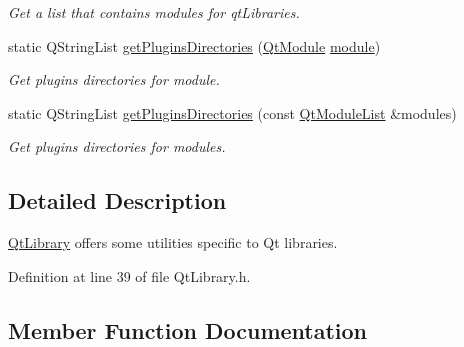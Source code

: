 \begin{DoxyCompactItemize}
\begin{DoxyCompactList}\small\item\em Get a list that contains modules for {\itshape qt\+Libraries}. \end{DoxyCompactList}\item 
static Q\+String\+List \hyperlink{class_mdt_1_1_deploy_utils_1_1_qt_library_a50c96c2d0b892da7c41d50ca627191bd}{get\+Plugins\+Directories} (\hyperlink{namespace_mdt_1_1_deploy_utils_af64a196dd2a56ed4930253e7fb4ed591}{Qt\+Module} \hyperlink{class_mdt_1_1_deploy_utils_1_1_qt_library_aa54f542e548bcab6da5e8a9696169a94}{module})
\begin{DoxyCompactList}\small\item\em Get plugins directories for {\itshape module}. \end{DoxyCompactList}\item 
static Q\+String\+List \hyperlink{class_mdt_1_1_deploy_utils_1_1_qt_library_ab555321caadc47fcb9458ba466287702}{get\+Plugins\+Directories} (const \hyperlink{class_mdt_1_1_deploy_utils_1_1_qt_module_list}{Qt\+Module\+List} \&modules)
\begin{DoxyCompactList}\small\item\em Get plugins directories for {\itshape modules}. \end{DoxyCompactList}\end{DoxyCompactItemize}


\subsection{Detailed Description}
\hyperlink{class_mdt_1_1_deploy_utils_1_1_qt_library}{Qt\+Library} offers some utilities specific to Qt libraries. 

Definition at line 39 of file Qt\+Library.\+h.



\subsection{Member Function Documentation}
